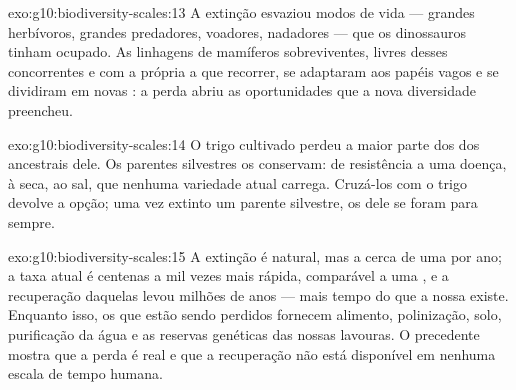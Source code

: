 \begin{solution}{exo:g10:biodiversity-scales:13}
A extinção esvaziou modos de vida --- grandes herbívoros, grandes
predadores, voadores, nadadores --- que os dinossauros tinham ocupado.
As linhagens de mamíferos sobreviventes, livres desses concorrentes e
com a  própria a que recorrer, se adaptaram aos
papéis vagos e se dividiram em novas : a perda abriu as
oportunidades que a nova diversidade preencheu.
\end{solution}

\begin{solution}{exo:g10:biodiversity-scales:14}
O trigo cultivado perdeu a maior parte dos  dos ancestrais dele.
Os parentes silvestres os conservam:  de resistência a uma
doença, à seca, ao sal, que nenhuma variedade atual carrega. Cruzá-los
com o trigo devolve a opção; uma vez extinto um parente silvestre, os
 dele se foram para sempre.
\end{solution}

\begin{solution}{exo:g10:biodiversity-scales:15}
A extinção é natural, mas a cerca de uma  por ano; a taxa atual
é centenas a mil vezes mais rápida, comparável a uma ,
e a recuperação daquelas levou milhões de anos --- mais tempo do que a
nossa  existe. Enquanto isso, os  que estão sendo
perdidos fornecem alimento, polinização, solo, purificação da água e as
reservas genéticas das nossas lavouras. O precedente mostra que a perda
é real e que a recuperação não está disponível em nenhuma escala de
tempo humana.
\end{solution}

